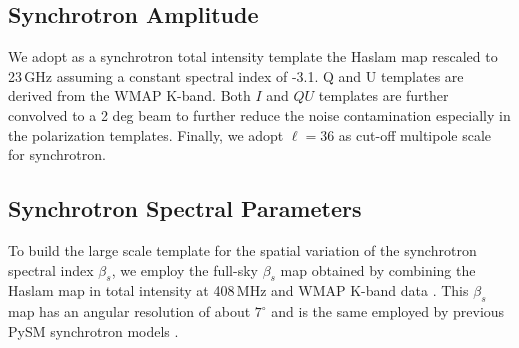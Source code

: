
\subsection{Synchrotron Amplitude}

We adopt as a synchrotron total intensity template the Haslam map rescaled to 23\,GHz assuming a constant spectral index of -3.1. Q and U templates are derived from the WMAP K-band. Both $I$ and $QU$ templates are further convolved to a  2 deg beam to further reduce the noise contamination especially in the polarization templates. Finally, we  adopt $\ell = 36$ as  cut-off multipole scale  for synchrotron.

\subsection{Synchrotron Spectral Parameters}
To build the large scale template for the spatial variation of the synchrotron spectral index $\beta_s$, we employ the full-sky $\beta_s$ map obtained by combining the Haslam map in total intensity at 408\,MHz \citep{Remazeilles:2014} and WMAP K-band data \citep{mivilledeschenes:2008}. This $\beta_s$ map has an angular resolution of about $7^{\circ}$ and is the same employed by previous PySM synchrotron models \citep{Thorne:2017}.

 

